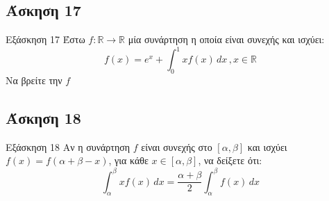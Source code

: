 \documentclass[greek]{beamer}
\begin{document}
\subsection{Άσκηση 17}
\begin{frame}[label=Άσκηση17,t]{Εξάσκηση 17}
   Έστω $f:\mathbb{R}\to\mathbb{R}$ μία συνάρτηση η οποία είναι συνεχής και ισχύει:
   $$f(x)=e^x+\int_{0}^{1} xf(x) \,dx\, , x\in\mathbb{R}$$
   Να βρείτε την $f$

\end{frame}

\subsection{Άσκηση 18}
\begin{frame}[label=Άσκηση18,t]{Εξάσκηση 18}
  Αν η συνάρτηση $f$ είναι συνεχής στο $[α,β]$ και ισχύει $f(x)=f(α+β-x)$, για κάθε $x\in [α,β]$, να δείξετε ότι:
  $$\int_{α}^{β} xf(x) \,dx=\dfrac{α+β}{2}\int_{α}^{β} f(x) \,dx$$

\end{frame}


%
%
%
%
%
%
\end{document}
